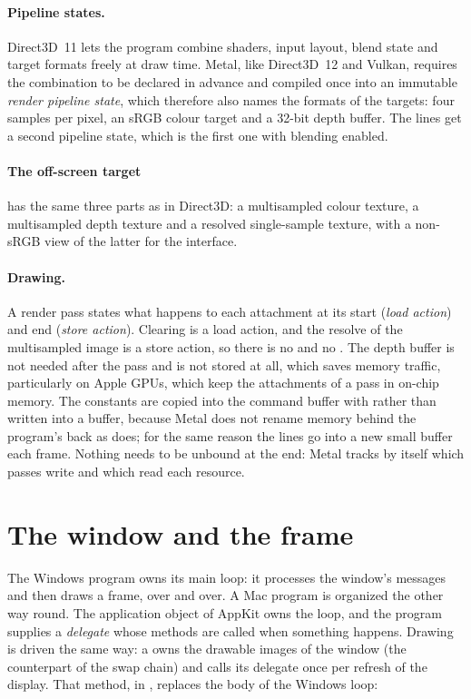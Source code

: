 \paragraph{Pipeline states.} Direct3D~11 lets the program combine shaders, input layout, blend
state and target formats freely at draw time. Metal, like Direct3D~12 and Vulkan, requires the
combination to be declared in advance and compiled once into an immutable \emph{render pipeline
state}, which therefore also names the formats of the targets: four samples per pixel, an sRGB
colour target and a 32-bit depth buffer. The lines get a second pipeline state, which is the
first one with blending enabled.


\paragraph{The off-screen target} has the same three parts as in Direct3D: a multisampled
colour texture, a multisampled depth texture and a resolved single-sample texture, with a
non-sRGB view of the latter for the interface.


\paragraph{Drawing.} A render pass states what happens to each attachment at its start
(\emph{load action}) and end (\emph{store action}). Clearing is a load action, and the resolve of
the multisampled image is a store action, so there is no  and no
. The depth buffer is not needed after the pass and is not stored at
all, which saves memory traffic, particularly on Apple GPUs, which keep the attachments of a
pass in on-chip memory. The constants are copied into the command buffer with
 rather than written into a buffer, because Metal does not rename memory
behind the program's back as  does; for the same reason the lines go
into a new small buffer each frame. Nothing needs to be unbound at the end: Metal tracks by
itself which passes write and which read each resource.


\section{The window and the frame}
\label{sec:macframe}
The Windows program owns its main loop: it processes the window's messages and then draws a
frame, over and over. A Mac program is organized the other way round. The application object
of AppKit owns the loop, and the program supplies a \emph{delegate} whose methods are called
when something happens. Drawing is driven the same way: a  owns the drawable
images of the window (the counterpart of the swap chain) and calls its delegate once per refresh
of the display. That method, in , replaces the body of the Windows loop:

